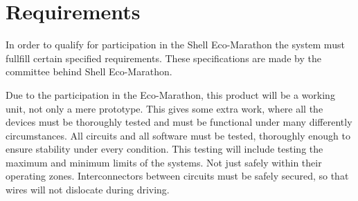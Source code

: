 \chapter{Requirements}
In order to qualify for participation in the Shell Eco-Marathon the system must fullfill certain specified requirements. These specifications are made by the committee behind Shell Eco-Marathon. 

Due to the participation in the Eco-Marathon, this product will be a working unit, not only a mere prototype. This gives some extra work, where all the devices must be thoroughly tested and must be functional under many differently circumstances. All circuits and all software must be tested, thoroughly enough to ensure stability under every condition. This testing will include testing the maximum and minimum limits of the systems. Not just safely within their operating zones. 
Interconnectors between circuits must be safely secured, so that wires will not dislocate during driving.

%



